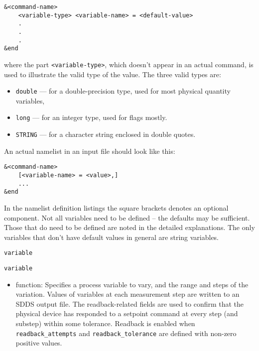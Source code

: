 \begin{itemize}
\begin{itemize}
\begin{verbatim}
&<command-name>
    <variable-type> <variable-name> = <default-value>
    .
    .
    .
&end
\end{verbatim}

where the part \verb+<variable-type>+, which doesn't appear in an
actual command, is used to illustrate the valid type of the value. The
three valid types are:
\begin{itemize}
   \item \verb+double+ --- for a double-precision type, used for most
   physical quantity variables,
   \item \verb+long+ ---   for an integer type, used for flags mostly.
   \item \verb+STRING+ --- for a character string enclosed in double quotes.
\end{itemize}
An actual namelist in an input file should look like this:
\begin{verbatim}
&<command-name>
    [<variable-name> = <value>,]
    ...
&end
\end{verbatim}

In the namelist definition listings the square brackets denotes an
optional component.  Not all variables need to be defined -- the
defaults may be sufficient.  Those that do need to be defined are
noted in the detailed explanations.  The only variables that don't
have default values in general are string variables.

\begin{htmlonly}
\end{itemize}
\end{itemize}
